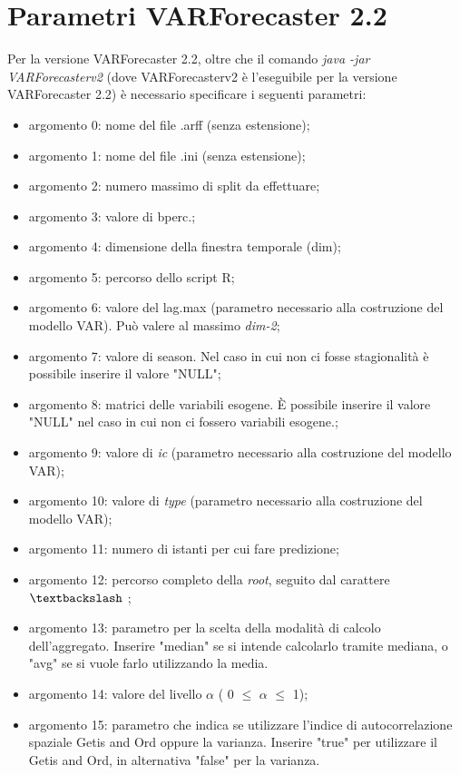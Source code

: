 \documentclass[12pt,a4paper,oneside,openright]{book}
\begin{document}
\section*{Parametri VARForecaster 2.2}
Per la versione VARForecaster 2.2, oltre che il comando \textit{java -jar VARForecasterv2} (dove VARForecasterv2 è l'eseguibile per la versione VARForecaster 2.2) è necessario specificare i seguenti parametri:
\begin{itemize}
\item argomento 0: nome del file .arff (senza estensione);
\item argomento 1: nome del file .ini (senza estensione);
\item argomento 2: numero massimo di split da effettuare;
\item argomento 3: valore di bperc.;
\item argomento 4: dimensione della finestra temporale (dim);
\item argomento 5: percorso dello script R;
\item argomento 6: valore del lag.max (parametro necessario alla costruzione del modello VAR). Può valere al massimo \textit{dim-2};
\item argomento 7: valore di season. Nel caso in cui non ci fosse stagionalità è possibile inserire il valore "NULL";
\item argomento 8: matrici delle variabili esogene. È possibile inserire il valore "NULL" nel caso in cui non ci fossero variabili esogene.;
\item argomento 9: valore di \textit{ic} (parametro necessario alla costruzione del modello VAR);
\item argomento 10: valore di \textit{type} (parametro necessario alla costruzione del modello VAR);
\item argomento 11: numero di istanti per cui fare predizione;
\item argomento 12: percorso completo della \textit{root}, seguito dal carattere $\textbackslash$ ;
\item argomento 13: parametro per la scelta della modalità di calcolo dell'aggregato. Inserire "median" se si intende calcolarlo tramite mediana, o "avg" se si vuole farlo utilizzando la media.
\item argomento 14: valore del livello $\alpha$ ( 0 $\leq$ $\alpha$ $\leq$ 1);
\item argomento 15: parametro che indica se utilizzare l'indice di autocorrelazione spaziale Getis and Ord oppure la varianza. Inserire "true" per utilizzare il Getis and Ord, in alternativa "false" per la varianza.
\end{itemize}
\end{document}
